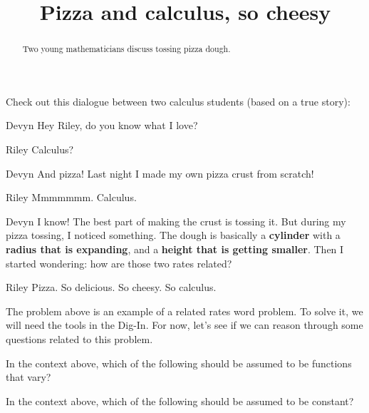 \documentclass{ximera}
\title[Break-Ground:]{Pizza and calculus, so cheesy}
\begin{document}
\begin{abstract}
Two young mathematicians discuss tossing pizza dough. 
\end{abstract}
\maketitle

Check out this dialogue between two calculus students (based on a true
story):


\begin{dialogue}
\item[Devyn] Hey Riley, do you know what I love?
\item[Riley] Calculus? 
\item[Devyn] And pizza! Last night I made my own pizza crust from
  scratch!
\item[Riley] Mmmmmmm. Calculus. 
\item[Devyn] I know! The best part of making the crust is tossing it.
  But during my pizza tossing, I noticed something.  The
  dough is basically a \textbf{cylinder} with a \textbf{radius that is
    expanding}, and a \textbf{height that is getting smaller}. Then I started
    wondering: how are those two rates related?
\item[Riley] Pizza. So delicious. So cheesy. So calculus.
\end{dialogue}


The problem above is an example of a related rates word problem.  To solve 
it, we will need the tools in the Dig-In.  For now, let's see if we can reason 
through some questions related to this problem.



\begin{problem}
  In the context above, which of the following should be assumed to be
  functions that vary?
  \begin{selectAll}
  \end{selectAll}
\end{problem}

\begin{problem}
  In the context above, which of the following should be assumed to be
  constant?
  \begin{selectAll}
  \end{selectAll}
\end{problem}



\end{document}
